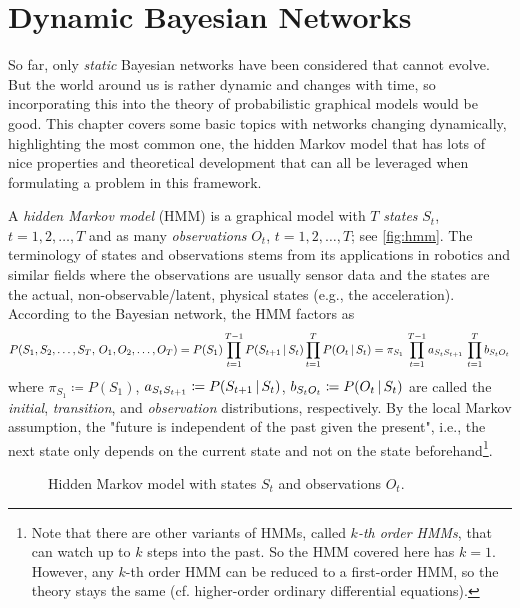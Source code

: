 \chapter{Dynamic Bayesian Networks}
	So far, only \emph{static} Bayesian networks have been considered that cannot evolve. But the world around us is rather dynamic and changes with time, so incorporating this into the theory of probabilistic graphical models would be good. This chapter covers some basic topics with networks changing dynamically, highlighting the most common one, the hidden Markov model that has lots of nice properties and theoretical development that can all be leveraged when formulating a problem in this framework.

	A \emph{hidden Markov model} (HMM) is a graphical model with \(T\) \emph{states} \(S_t\), \( t = 1, 2, \dots, T \) and as many \emph{observations} \(O_t\), \( t = 1, 2, \dots, T \); see \autoref{fig:hmm}. The terminology of states and observations stems from its applications in robotics and similar fields where the observations are usually sensor data and the states are the actual, non-observable/latent, physical states (e.g., the acceleration). According to the Bayesian network, the HMM factors as
	\begin{equation}
		P(S_1, S_2, \dots, S_T,\, O_1, O_2, \dots, O_T)
			= P(S_1) \prod_{t = 1}^{T - 1} P(S_{t + 1} \,\vert\, S_t) \prod_{t = 1}^{T} P(O_t \,\vert\, S_t)
			= \pi_{S_1} \, \prod_{t = 1}^{T - 1} a_{S_t S_{t + 1}} \, \prod_{t = 1}^{T} b_{S_t O_t}  \label{eqn:hmmFactor}
	\end{equation}
	where \( \pi_{S_1} \coloneqq P(S_1) \), \( a_{S_t S_{t + 1}} \coloneqq P(S_{t + 1} \,\vert\, S_t) \), \( b_{S_t O_t} \coloneqq P(O_t \,\vert\, S_t) \) are called the \emph{initial}, \emph{transition}, and \emph{observation} distributions, respectively. By the local Markov assumption, the "future is independent of the past given the present", i.e., the next state only depends on the current state and not on the state beforehand\footnote{Note that there are other variants of HMMs, called \emph{\(k\)-th order HMMs}, that can watch up to \(k\) steps into the past. So the HMM covered here has \(k = 1\). However, any \(k\)-th order HMM can be reduced to a first-order HMM, so the theory stays the same (cf. higher-order ordinary differential equations).}.

	\begin{figure}
		\centering
		\caption[Hidden Markov Model]{Hidden Markov model with states \( S_t \) and observations \( O_t \).}
		\label{fig:hmm}
	\end{figure}

